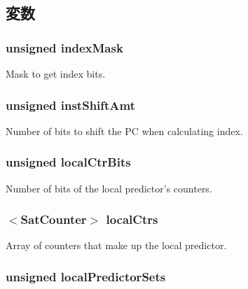 \subsection{変数}
\hypertarget{classLocalBP_af74847baefa86f9623cf55bb28803c99}{
\subsubsection[{indexMask}]{\setlength{\rightskip}{0pt plus 5cm}unsigned {\bf indexMask}}}
\label{classLocalBP_af74847baefa86f9623cf55bb28803c99}
Mask to get index bits. \hypertarget{classLocalBP_a8ad2ee60a6143561753205840ad144e7}{
\subsubsection[{instShiftAmt}]{\setlength{\rightskip}{0pt plus 5cm}unsigned {\bf instShiftAmt}}}
\label{classLocalBP_a8ad2ee60a6143561753205840ad144e7}
Number of bits to shift the PC when calculating index. \hypertarget{classLocalBP_a815998927bcd79afe7f787b90f9954f5}{
\subsubsection[{localCtrBits}]{\setlength{\rightskip}{0pt plus 5cm}unsigned {\bf localCtrBits}}}
\label{classLocalBP_a815998927bcd79afe7f787b90f9954f5}
Number of bits of the local predictor's counters. \hypertarget{classLocalBP_a639a100e0452520604d19db58d98721d}{
\subsubsection[{localCtrs}]{$<${\bf SatCounter}$>$ {\bf localCtrs}}}
\label{classLocalBP_a639a100e0452520604d19db58d98721d}
Array of counters that make up the local predictor. \hypertarget{classLocalBP_a82806c3c6e4b9e285b11f8739a692665}{
\subsubsection[{localPredictorSets}]{\setlength{\rightskip}{0pt plus 5cm}unsigned {\bf localPredictorSets}}}

